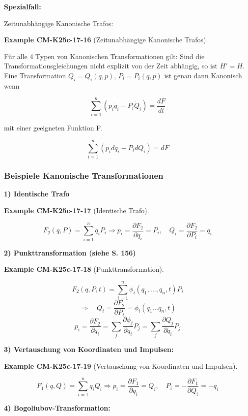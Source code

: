\documentclass[10pt, letterpaper]{article}
\newcommand{\CustomHeading}[3]{%
  \par\medskip\noindent%
  \textbf{#1 #2} \textnormal{(#3)}.\enskip%
}
\newenvironment{EXA}[2]{\begin{unitbox}\CustomHeading{Example}{#1}{#2}}{\end{unitbox}}
\begin{document}
\textbf{Spezialfall:} 

Zeitunabhängige Kanonische Trafos:

\begin{EXA}{CM-K25c-17-16}{Zeitunabhängige Kanonische Trafos}
Für alle 4 Typen von Kanonischen Transformationen gilt:
Sind die Transformationsgleichungen nicht explizit von der Zeit abhängig, so ist $H' = H$. Eine Transformation $Q_i = Q_i(q,p)$, $P_i = P_i(q,p)$ ist genau dann Kanonisch wenn

\[\sum_{i=1}^n (p_i\dot{q}_i - P_i\dot{Q}_i) = \frac{dF}{dt}\]

mit einer geeigneten Funktion F.

\[\sum_{i=1}^n (p_idq_i - P_idQ_i) = dF\]
\end{EXA}




\pagebreak

\subsubsection*{Beispiele Kanonische Transformationen}

\textbf{1) Identische Trafo}


\begin{EXA}{CM-K25c-17-17}{Identische Trafo}
\[F_2(q,P) = \sum_{i=1}^n q_iP_i \Rightarrow p_i = \frac{\partial F_2}{\partial q_i} = P_i, \quad Q_i = \frac{\partial F_2}{\partial P_i} = q_i\]
\end{EXA}

\textbf{2) Punkttransformation (siehe S. 156)}


\begin{EXA}{CM-K25c-17-18}{Punkttransformation}
\[F_2(q,P,t) = \sum_{i=1}^n \phi_i(q_1,...,q_n,t)P_i\]
\[\Rightarrow \quad Q_i = \frac{\partial F_2}{\partial P_i} = \phi_i(q_1...q_n,t)\]
\[p_i = \frac{\partial F_2}{\partial q_i} = \sum_j \frac{\partial \phi_j}{\partial q_i}P_j = \sum_j \frac{\partial Q_j}{\partial q_i}P_j\]
\end{EXA}

\textbf{3) Vertauschung von Koordinaten und Impulsen:}


\begin{EXA}{CM-K25c-17-19}{Vertauschung von Koordinaten und Impulsen}
\[F_1(q,Q) = \sum_{i=1}^n q_iQ_i \Rightarrow p_i = \frac{\partial F_1}{\partial q_i} = Q_i, \quad P_i = -\frac{\partial F_1}{\partial Q_i} = -q_i\]
\end{EXA}

\textbf{4) Bogoliubov-Transformation:}
\end{document}
